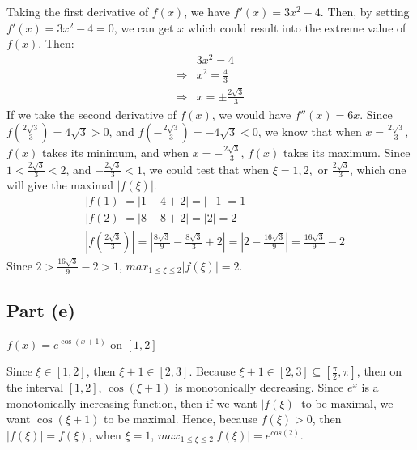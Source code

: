 \begin{answer}
    Taking the first derivative of $f(x)$, we have $f'(x) = 3x^2 - 4$. Then, by setting $f'(x) = 3x^2 - 4 = 0$, we can get $x$ which could result into the extreme value of $f(x)$. Then:
    \begin{align}
        & 3x^2 = 4\\
        \Rightarrow & x^2 = \tfrac{4}{3}\\
        \Rightarrow & x = \pm \tfrac{2\sqrt{3}}{3}
    \end{align}
    If we take the second derivative of $f(x)$, we would have $f''(x) = 6x$. Since $f\left(\tfrac{2\sqrt{3}}{3}\right) = 4\sqrt{3} > 0$, and $f\left(-\tfrac{2\sqrt{3}}{3}\right) = -4\sqrt{3} < 0$, we know that when $x = \tfrac{2\sqrt{3}}{3}$, $f(x)$ takes its minimum, and when $x = -\tfrac{2\sqrt{3}}{3}$, $f(x)$ takes its maximum. Since $1 < \tfrac{2\sqrt{3}}{3} < 2$, and $-\tfrac{2\sqrt{3}}{3} < 1$, we could test that when $\xi = 1, 2, \text{ or } \tfrac{2\sqrt{3}}{3}$, which one will give the maximal $\lvert f(\xi) \rvert$. 
    \begin{align}
        & \lvert f(1) \rvert = \lvert 1 - 4 + 2 \rvert = \lvert -1 \rvert = 1\\
        & \lvert f(2) \rvert = \lvert 8 - 8 + 2 \rvert = \lvert 2 \rvert = 2\\
        & \left\lvert f\left(\tfrac{2\sqrt{3}}{3}\right) \right\rvert = \left\lvert \tfrac{8\sqrt{3}}{9} - \tfrac{8\sqrt{3}}{3} + 2\right\rvert = \left\lvert 2 - \tfrac{16\sqrt{3}}{9} \right\rvert = \tfrac{16\sqrt{3}}{9} - 2
    \end{align}
    Since $2 > \tfrac{16\sqrt{3}}{9} - 2 > 1$, $max_{1 \leq \xi \leq 2}{\lvert f(\xi) \rvert} = 2$.
\end{answer}

\subsection{Part (e)}

\begin{question}
\begin{center}
    $f(x) = e^{\cos{(x+1)}}$ on $[1,2]$
\end{center}
\end{question}

\begin{answer}
    Since $\xi \in [1,2]$, then $\xi + 1 \in [2,3]$. Because $\xi + 1 \in [2,3] \subseteq \left[\tfrac{\pi}{2},\pi\right]$, then on the interval $[1,2]$, $\cos{(\xi+1)}$ is monotonically decreasing. Since $e^x$ is a monotonically increasing function, then if we want $\lvert f(\xi) \rvert$ to be maximal, we want $\cos{(\xi+1)}$ to be maximal. Hence, because $f(\xi) > 0$, then $\lvert f(\xi) \rvert = f(\xi)$, when $\xi = 1$, $max_{1 \leq \xi \leq 2}{\lvert f(\xi) \rvert} = e^{cos(2)}$.
\end{answer}

